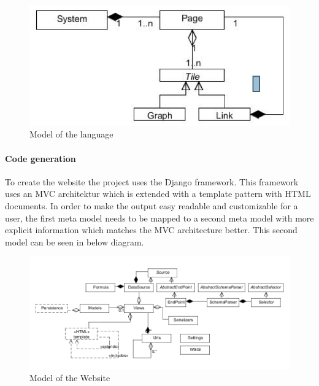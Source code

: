 \begin{figure}
\begin{center}
\includegraphics[width=\linewidth]{images/websitelanguagemodel}
\end{center}
\caption{Model of the language}
\label{fig:websitelangmodel}
\end{figure}

\paragraph{Code generation}
To create the website the project uses the Django framework. 
This framework uses an MVC architektur which is extended with a template pattern with HTML documents. 
In order to make the output easy readable and customizable for a user, the first meta model needs to be mapped to a second meta model with more explicit information which matches the MVC architecture better.
This second model can be seen in below diagram. 

\begin{figure}
\begin{center}
\includegraphics[width=\linewidth]{images/websitemodel}
\end{center}
\caption{Model of the Website}
\label{fig:websitemodel}
\end{figure}


